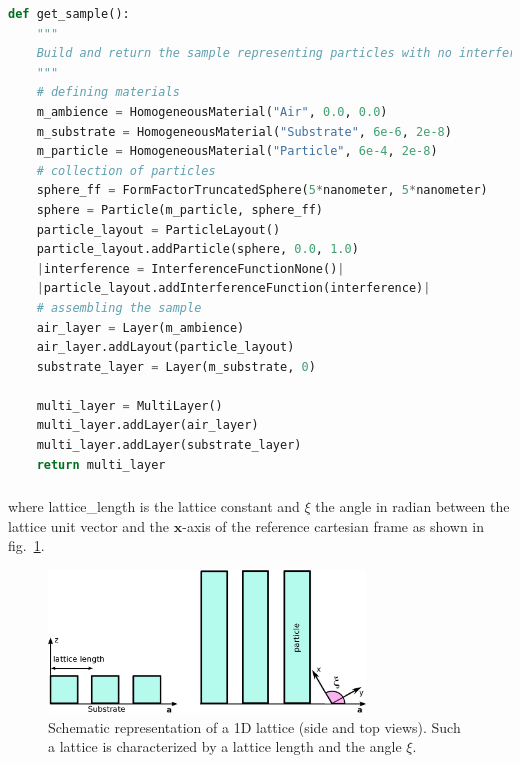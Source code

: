 \begin{lstlisting}[language=python, style=eclipseboxed,numbers=none,nolol,caption={\Code{Python} script to simulate a sample made of half-spheres deposited on a substrate layer without any interference. The part specific to the interferences is marked in a red italic font.},label={lst:nointerf}]
def get_sample():
    """
    Build and return the sample representing particles with no interference
    """
    # defining materials
    m_ambience = HomogeneousMaterial("Air", 0.0, 0.0)
    m_substrate = HomogeneousMaterial("Substrate", 6e-6, 2e-8)
    m_particle = HomogeneousMaterial("Particle", 6e-4, 2e-8)
    # collection of particles
    sphere_ff = FormFactorTruncatedSphere(5*nanometer, 5*nanometer)
    sphere = Particle(m_particle, sphere_ff)
    particle_layout = ParticleLayout()
    particle_layout.addParticle(sphere, 0.0, 1.0)
    |interference = InterferenceFunctionNone()| 
    |particle_layout.addInterferenceFunction(interference)|
    # assembling the sample
    air_layer = Layer(m_ambience)
    air_layer.addLayout(particle_layout)
    substrate_layer = Layer(m_substrate, 0)

    multi_layer = MultiLayer()
    multi_layer.addLayer(air_layer)
    multi_layer.addLayer(substrate_layer)
    return multi_layer
\end{lstlisting}

\newpage
\subsubsection{  } 
where lattice\_length is the lattice constant and $\xi$ the angle in radian between the lattice unit vector and the $\mathbf{x}$-axis of the reference cartesian frame as shown in fig.~\ref{fig:1dgrating}.

\begin{figure}[ht]
\begin{center}
\includegraphics[width=0.75\textwidth]{Figures/drawing/1DGrating.eps}
\end{center}
\caption{Schematic representation of a 1D lattice (side and top views). Such a lattice is characterized by a lattice length and the angle $\xi$.}
\label{fig:1dgrating}
\end{figure}

